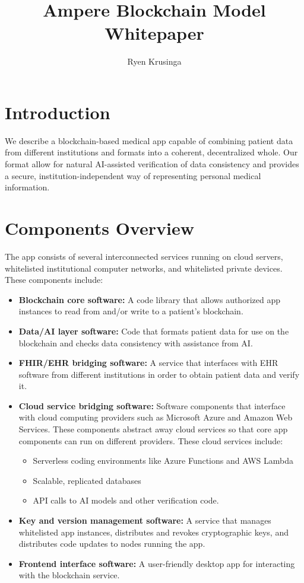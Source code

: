 \documentclass[12pt]{article}
\title{Ampere Blockchain Model Whitepaper}
\author{Ryen Krusinga}
\begin{document}
\maketitle

\tableofcontents


\section{Introduction}
We describe a blockchain-based medical app capable of combining patient data from different institutions and formats into a coherent, decentralized whole. Our format allow for natural AI-assisted verification of data consistency and provides a secure, institution-independent way of representing personal medical information.

\section{Components Overview}
The app consists of several interconnected services running on cloud servers, whitelisted institutional computer networks, and whitelisted private devices. These components include:
\begin{itemize}
\item {\bf Blockchain core software:} A code library that allows authorized app instances to read from and/or write to a patient's blockchain.
\item {\bf Data/AI layer software:} Code that formats patient data for use on the blockchain and checks data consistency with assistance from AI.
\item {\bf FHIR/EHR bridging software:} A service that interfaces with EHR software from different institutions in order to obtain patient data and verify it.
\item {\bf Cloud service bridging software:} Software components that interface with cloud computing providers such as Microsoft Azure and Amazon Web Services. These components abstract away cloud services so that core app components can run on different providers. These cloud services include:
	\begin{itemize}
	\item Serverless coding environments like Azure Functions and AWS Lambda
	\item Scalable, replicated databases
	\item API calls to AI models and other verification code.
	\end{itemize}
\item {\bf Key and version management software:} A service that manages whitelisted app instances, distributes and revokes cryptographic keys, and distributes code updates to nodes running the app.
\item {\bf Frontend interface software:} A user-friendly desktop app for interacting with the blockchain service.
\end{itemize}
\end{document}

